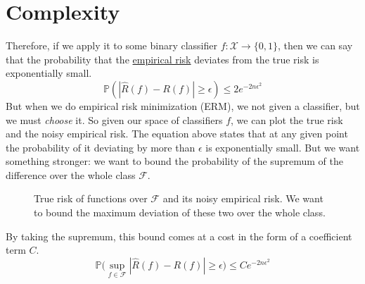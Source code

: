 \section{Complexity}

  Therefore, if we apply it to some binary classifier $f: \mathcal{X} \rightarrow \{0, 1\}$, then we can say that the probability that the \hyperref[def:empirical-risk]{empirical risk} deviates from the true risk is exponentially small. 
  \begin{equation}
    \mathbb{P} (|\hat{R} (f) - R(f)| \geq \epsilon) \leq 2e^{- 2 n \epsilon^2}
  \end{equation}
  But when we do empirical risk minimization (ERM), we not given a classifier, but we must \textit{choose} it. So given our space of classifiers $f$, we can plot the true risk and the noisy empirical risk. The equation above states that at any given point the probability of it deviating by more than $\epsilon$ is exponentially small. But we want something stronger: we want to bound the probability of the supremum of the difference over the whole class $\mathcal{F}$. 

  \begin{figure}[H]
    \centering 
    \caption{True risk of functions over $\mathcal{F}$ and its noisy empirical risk. We want to bound the maximum deviation of these two over the whole class.} 
    \label{fig:true_vs_empirical_risk}
  \end{figure}

  By taking the supremum, this bound comes at a cost in the form of a coefficient term $C$. 
  \begin{equation}
    \mathbb{P} \big( \sup_{f \in \mathcal{F}} | \hat{R} (f) - R(f) | \geq \epsilon \big) \leq C e^{-2 n \epsilon^2}
  \end{equation}

